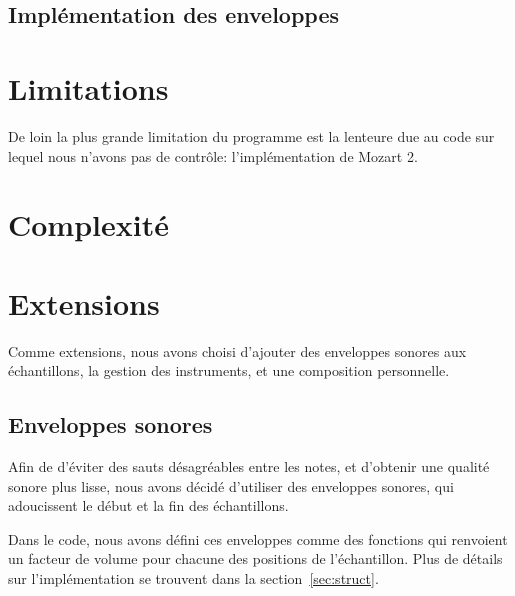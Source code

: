\documentclass[a4paper,12pt]{article}
\begin{document}
\subsection{Implémentation des enveloppes}
\label{sec:impl_enveloppes}

\section{Limitations}

De loin la plus grande limitation du programme est la lenteure due au code sur lequel nous n'avons pas de contrôle: l'implémentation de Mozart 2.

\section{Complexité}

\section{Extensions}

Comme extensions, nous avons choisi d'ajouter des enveloppes sonores
aux échantillons, la gestion des instruments, et une composition personnelle.

\subsection{Enveloppes sonores}
\label{sec:enveloppes}
Afin de d'éviter des sauts désagréables entre les notes,
et d'obtenir une qualité sonore plus lisse,
nous avons décidé d'utiliser des enveloppes sonores,
qui adoucissent le début et la fin des échantillons.

Dans le code, nous avons défini ces enveloppes comme des fonctions
qui renvoient un facteur de volume pour chacune des positions
de l'échantillon.
Plus de détails sur l'implémentation se trouvent
dans la section~\ref{sec:struct}.
\end{document}
